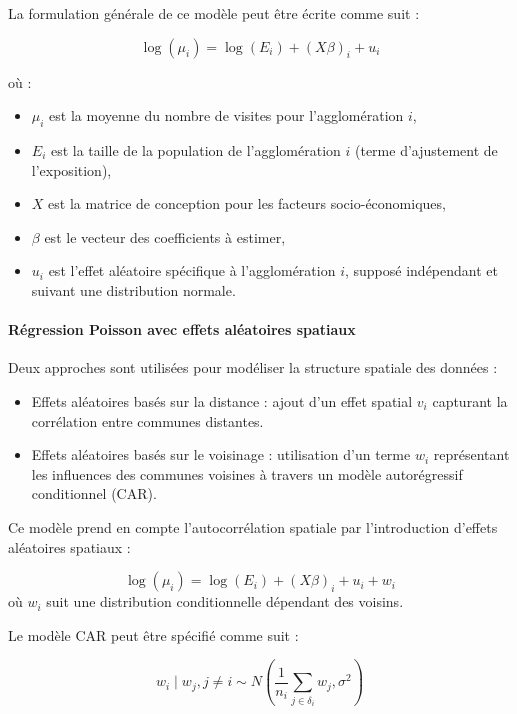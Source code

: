 \documentclass[
]{article}
\providecommand{\tightlist}{%
  \setlength{\itemsep}{0pt}\setlength{\parskip}{0pt}}
\begin{document}
La formulation générale de ce modèle peut être écrite comme suit :

\[
\log(\mu_i) = \log(E_i) + (X\beta)_i + u_i
\]

où :

\begin{itemize}
\tightlist
\item
  \(\mu_i\) est la moyenne du nombre de visites pour l'agglomération
  \(i\),
\item
  \(E_i\) est la taille de la population de l'agglomération \(i\) (terme
  d'ajustement de l'exposition),
\item
  \(X\) est la matrice de conception pour les facteurs
  socio-économiques,
\item
  \(\beta\) est le vecteur des coefficients à estimer,
\item
  \(u_i\) est l'effet aléatoire spécifique à l'agglomération \(i\),
  supposé indépendant et suivant une distribution normale.
\end{itemize}

\paragraph{Régression Poisson avec effets aléatoires
spatiaux}\label{ruxe9gression-poisson-avec-effets-aluxe9atoires-spatiaux}

Deux approches sont utilisées pour modéliser la structure spatiale des
données :

\begin{itemize}
\item
  Effets aléatoires basés sur la distance : ajout d'un effet spatial
  \(v_i\) capturant la corrélation entre communes distantes.
\item
  Effets aléatoires basés sur le voisinage : utilisation d'un terme
  \(w_i\) représentant les influences des communes voisines à travers un
  modèle autorégressif conditionnel (CAR).
\end{itemize}

Ce modèle prend en compte l'autocorrélation spatiale par l'introduction
d'effets aléatoires spatiaux :

\[
\log(\mu_i) = \log(E_i) + (X\beta)_i + u_i + w_i
\] où \(w_i\) suit une distribution conditionnelle dépendant des
voisins.

Le modèle CAR peut être spécifié comme suit :

\[
w_i \mid w_j, j \neq i \sim N \left( \frac{1}{n_i} \sum_{j \in \delta_i} w_j, \sigma^2 \right)
\]
\end{document}
